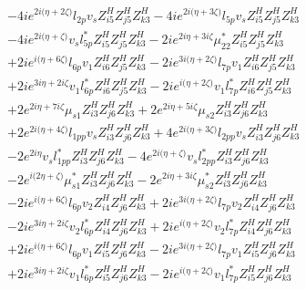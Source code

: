 \begin{align}
 &-4 i e^{2 i \Big(\eta +2 \zeta \Big)} l_{2p} v_s Z_{{i 5}}^{H} Z_{{j 5}}^{H} Z_{{k 3}}^{H} -4 i e^{2 i \Big(\eta +3 \zeta \Big)} l_{5p} v_s Z_{{i 5}}^{H} Z_{{j 5}}^{H} Z_{{k 3}}^{H} \nonumber \\ 
 &-4 i e^{2 i \Big(\eta +\zeta \Big)} v_s l_{5p}^* Z_{{i 5}}^{H} Z_{{j 5}}^{H} Z_{{k 3}}^{H} -2 i e^{2 i \eta +3 i \zeta } \mu_{22}^* Z_{{i 5}}^{H} Z_{{j 5}}^{H} Z_{{k 3}}^{H} \nonumber \\ 
 &+2 i e^{i \Big(\eta +6 \zeta \Big)} l_{6p} v_1 Z_{{i 6}}^{H} Z_{{j 5}}^{H} Z_{{k 3}}^{H} -2 i e^{3 i \Big(\eta +2 \zeta \Big)} l_{7p} v_1 Z_{{i 6}}^{H} Z_{{j 5}}^{H} Z_{{k 3}}^{H} \nonumber \\ 
 &+2 i e^{3 i \eta +2 i \zeta } v_1 l_{6p}^* Z_{{i 6}}^{H} Z_{{j 5}}^{H} Z_{{k 3}}^{H} -2 i e^{i \Big(\eta +2 \zeta \Big)} v_1 l_{7p}^* Z_{{i 6}}^{H} Z_{{j 5}}^{H} Z_{{k 3}}^{H} \nonumber \\ 
 &+2 e^{2 i \eta +7 i \zeta } \mu_{s1} Z_{{i 3}}^{H} Z_{{j 6}}^{H} Z_{{k 3}}^{H} +2 e^{2 i \eta +5 i \zeta } \mu_{s2} Z_{{i 3}}^{H} Z_{{j 6}}^{H} Z_{{k 3}}^{H} \nonumber \\ 
 &+2 e^{2 i \Big(\eta +4 \zeta \Big)} l_{1pp} v_s Z_{{i 3}}^{H} Z_{{j 6}}^{H} Z_{{k 3}}^{H} +4 e^{2 i \Big(\eta +3 \zeta \Big)} l_{2pp} v_s Z_{{i 3}}^{H} Z_{{j 6}}^{H} Z_{{k 3}}^{H} \nonumber \\ 
 &-2 e^{2 i \eta } v_s l_{1pp}^* Z_{{i 3}}^{H} Z_{{j 6}}^{H} Z_{{k 3}}^{H} -4 e^{2 i \Big(\eta +\zeta \Big)} v_s l_{2pp}^* Z_{{i 3}}^{H} Z_{{j 6}}^{H} Z_{{k 3}}^{H} \nonumber \\ 
 &-2 e^{i \Big(2 \eta +\zeta \Big)} \mu_{s1}^* Z_{{i 3}}^{H} Z_{{j 6}}^{H} Z_{{k 3}}^{H} -2 e^{2 i \eta +3 i \zeta } \mu_{s2}^* Z_{{i 3}}^{H} Z_{{j 6}}^{H} Z_{{k 3}}^{H} \nonumber \\ 
 &-2 i e^{i \Big(\eta +6 \zeta \Big)} l_{6p} v_2 Z_{{i 4}}^{H} Z_{{j 6}}^{H} Z_{{k 3}}^{H} +2 i e^{3 i \Big(\eta +2 \zeta \Big)} l_{7p} v_2 Z_{{i 4}}^{H} Z_{{j 6}}^{H} Z_{{k 3}}^{H} \nonumber \\ 
 &-2 i e^{3 i \eta +2 i \zeta } v_2 l_{6p}^* Z_{{i 4}}^{H} Z_{{j 6}}^{H} Z_{{k 3}}^{H} +2 i e^{i \Big(\eta +2 \zeta \Big)} v_2 l_{7p}^* Z_{{i 4}}^{H} Z_{{j 6}}^{H} Z_{{k 3}}^{H} \nonumber \\ 
 &+2 i e^{i \Big(\eta +6 \zeta \Big)} l_{6p} v_1 Z_{{i 5}}^{H} Z_{{j 6}}^{H} Z_{{k 3}}^{H} -2 i e^{3 i \Big(\eta +2 \zeta \Big)} l_{7p} v_1 Z_{{i 5}}^{H} Z_{{j 6}}^{H} Z_{{k 3}}^{H} \nonumber \\ 
 &+2 i e^{3 i \eta +2 i \zeta } v_1 l_{6p}^* Z_{{i 5}}^{H} Z_{{j 6}}^{H} Z_{{k 3}}^{H} -2 i e^{i \Big(\eta +2 \zeta \Big)} v_1 l_{7p}^* Z_{{i 5}}^{H} Z_{{j 6}}^{H} Z_{{k 3}}^{H} \nonumber \\ 

\end{align}
